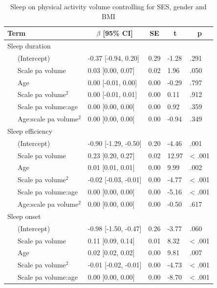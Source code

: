 \documentclass[
  man]{apa6}
\begin{document}
\begin{table}[tbp]

\begin{center}
\begin{threeparttable}

\caption{\label{tab:sleep-by-volume}Sleep on physical activity volume controlling for SES, gender and BMI}

\begin{tabular}{lllll}
\toprule
Term & \multicolumn{1}{c}{$\beta$ [95\% CI]} & \multicolumn{1}{c}{SE} & \multicolumn{1}{c}{t} & \multicolumn{1}{c}{p}\\
\midrule
Sleep duration &  &  &  & \\
\ \ \ (Intercept) & -0.37 [-0.94, 0.20] & 0.29 & -1.28 & .291\\
\ \ \ Scale  pa  volume & 0.03 [0.00, 0.07] & 0.02 & 1.96 & .050\\
\ \ \ Age & 0.00 [-0.01, 0.00] & 0.00 & -0.29 & .797\\
\ \ \ Scale  pa  volume$^2$ & 0.00 [-0.01, 0.01] & 0.00 & 0.11 & .912\\
\ \ \ Scale  pa  volume:age & 0.00 [0.00, 0.00] & 0.00 & 0.92 & .359\\
\ \ \ Age:scale  pa  volume$^2$ & 0.00 [0.00, 0.00] & 0.00 & -0.94 & .349\\
Sleep efficiency &  &  &  & \\
\ \ \ (Intercept) & -0.90 [-1.29, -0.50] & 0.20 & -4.46 & .001\\
\ \ \ Scale  pa  volume & 0.23 [0.20, 0.27] & 0.02 & 12.97 & < .001\\
\ \ \ Age & 0.01 [0.01, 0.01] & 0.00 & 9.99 & .002\\
\ \ \ Scale  pa  volume$^2$ & -0.02 [-0.03, -0.01] & 0.00 & -4.77 & < .001\\
\ \ \ Scale  pa  volume:age & 0.00 [0.00, 0.00] & 0.00 & -5.16 & < .001\\
\ \ \ Age:scale  pa  volume$^2$ & 0.00 [0.00, 0.00] & 0.00 & -0.50 & .617\\
Sleep onset &  &  &  & \\
\ \ \ (Intercept) & -0.98 [-1.50, -0.47] & 0.26 & -3.77 & .060\\
\ \ \ Scale  pa  volume & 0.11 [0.09, 0.14] & 0.01 & 8.32 & < .001\\
\ \ \ Age & 0.02 [0.02, 0.02] & 0.00 & 9.81 & .007\\
\ \ \ Scale  pa  volume$^2$ & -0.01 [-0.02, -0.01] & 0.00 & -4.73 & < .001\\
\ \ \ Scale  pa  volume:age & 0.00 [0.00, 0.00] & 0.00 & -8.70 & < .001\\

\end{tabular}
\end{threeparttable}
\end{center}
\end{table}
\end{document}
